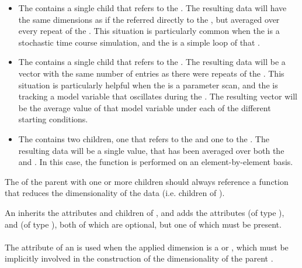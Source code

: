 \begin{blockChanged}
\begin{itemize}
        \item The \Variable contains a single \AppliedDimension child that refers to the \RepeatedTask.  The resulting data will have the same dimensions as if the \Variable referred directly to the \Task, but averaged over every repeat of the \RepeatedTask.  This situation is particularly common when the \Task is a stochastic time course simulation, and the \RepeatedTask is a simple loop of that \Task.
        \item The \Variable contains a single \AppliedDimension child that refers to the \Task.  The resulting data will be a vector with the same number of entries as there were repeats of the \RepeatedTask.  This situation is particularly helpful when the \RepeatedTask is a parameter scan, and the \Variable is tracking a model variable that oscillates during the \Task.  The resulting vector will be the average value of that model variable under each of the different starting conditions.
        \item The \Variable contains two \AppliedDimension children, one that refers to the \RepeatedTask and one to the \Task.  The resulting data will be a single value, that has been averaged over both the \Task and \RepeatedTask.  In this case, the function is performed on an element-by-element basis.
\end{itemize}

The  of the parent \Variable with one or more \AppliedDimension children should always reference a function that reduces the dimensionality of the data (i.e. children of ).



An \AppliedDimension inherits the attributes and children of \SedBase, and adds the attributes  (of type \SIdRef), and  (of type ), both of which are optional, but one of which must be present.

\paragraph*{}
The  attribute of an \AppliedDimension is used when the applied dimension is a \Task or \RepeatedTask, which must be implicitly involved in the construction of the dimensionality of the parent \Variable.


\end{blockChanged}

